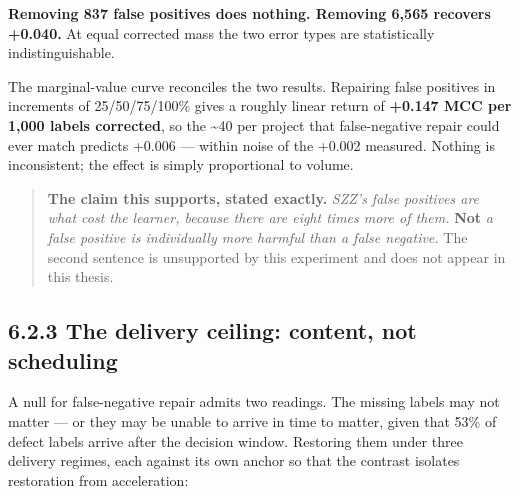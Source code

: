 \textbf{Removing 837 false positives does nothing. Removing 6,565
recovers +0.040.} At equal corrected mass the two error types are
statistically indistinguishable.

The marginal-value curve reconciles the two results. Repairing false
positives in increments of 25/50/75/100\% gives a roughly linear return
of \textbf{+0.147 MCC per 1,000 labels corrected}, so the
\textasciitilde40 per project that false-negative repair could ever
match predicts +0.006 --- within noise of the +0.002 measured. Nothing
is inconsistent; the effect is simply proportional to volume.

\begin{quote}
\textbf{The claim this supports, stated exactly.} \emph{SZZ's false
positives are what cost the learner, because there are eight times more
of them.} \textbf{Not} \emph{a false positive is individually more
harmful than a false negative.} The second sentence is unsupported by
this experiment and does not appear in this thesis.
\end{quote}

\subsection{6.2.3 The delivery ceiling: content, not
scheduling}\label{the-delivery-ceiling-content-not-scheduling}

A null for false-negative repair admits two readings. The missing labels
may not matter --- or they may be unable to arrive in time to matter,
given that 53\% of defect labels arrive after the decision window.
Restoring them under three delivery regimes, each against its own anchor
so that the contrast isolates restoration from acceleration:

